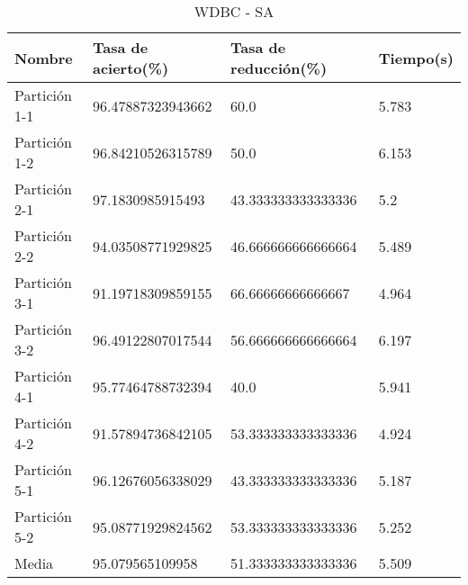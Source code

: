 \begin{table}[H]
	\centering
	\caption{WDBC - SA}
	\label{WDBC-SA}
	\begin{tabular}{l|lll}
		Nombre        & Tasa de acierto(\%) & Tasa de reducción(\%) & Tiempo(s) \\ \hline
		Partición 1-1 & 96.47887323943662   & 60.0                  & 5.783     \\
		Partición 1-2 & 96.84210526315789   & 50.0                  & 6.153     \\
		Partición 2-1 & 97.1830985915493    & 43.333333333333336    & 5.2       \\
		Partición 2-2 & 94.03508771929825   & 46.666666666666664    & 5.489     \\
		Partición 3-1 & 91.19718309859155   & 66.66666666666667     & 4.964     \\
		Partición 3-2 & 96.49122807017544   & 56.666666666666664    & 6.197     \\
		Partición 4-1 & 95.77464788732394   & 40.0                  & 5.941     \\
		Partición 4-2 & 91.57894736842105   & 53.333333333333336    & 4.924     \\
		Partición 5-1 & 96.12676056338029   & 43.333333333333336    & 5.187     \\
		Partición 5-2 & 95.08771929824562   & 53.333333333333336    & 5.252     \\ \hline
		Media         & 95.079565109958     & 51.333333333333336    & 5.509    
	\end{tabular}
\end{table}